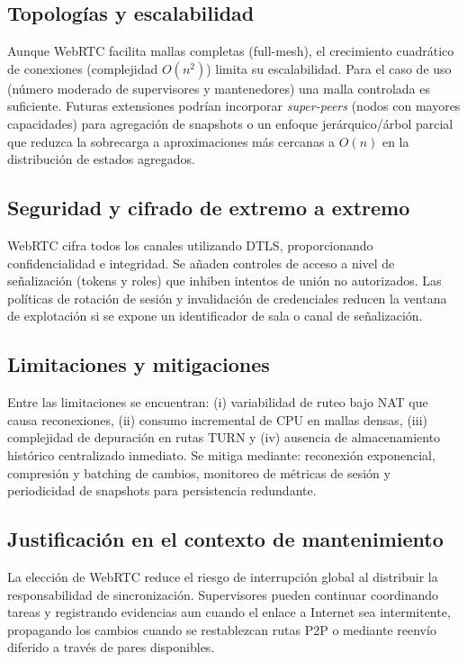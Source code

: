 \documentclass[12pt,a4paper]{report}
\begin{document}
\subsection*{Topologías y escalabilidad}
Aunque WebRTC facilita mallas completas (full-mesh), el crecimiento cuadrático de conexiones (complejidad $O(n^2)$) limita su escalabilidad. Para el caso de uso (número moderado de supervisores y mantenedores) una malla controlada es suficiente. Futuras extensiones podrían incorporar \textit{super-peers} (nodos con mayores capacidades) para agregación de snapshots o un enfoque jerárquico/árbol parcial que reduzca la sobrecarga a aproximaciones más cercanas a $O(n)$ en la distribución de estados agregados.

\subsection*{Seguridad y cifrado de extremo a extremo}
WebRTC cifra todos los canales utilizando DTLS, proporcionando confidencialidad e integridad. Se añaden controles de acceso a nivel de señalización (tokens y roles) que inhiben intentos de unión no autorizados. Las políticas de rotación de sesión y invalidación de credenciales reducen la ventana de explotación si se expone un identificador de sala o canal de señalización.

\subsection*{Limitaciones y mitigaciones}
Entre las limitaciones se encuentran: (i) variabilidad de ruteo bajo NAT que causa reconexiones, (ii) consumo incremental de CPU en mallas densas, (iii) complejidad de depuración en rutas TURN y (iv) ausencia de almacenamiento histórico centralizado inmediato. Se mitiga mediante: reconexión exponencial, compresión y batching de cambios, monitoreo de métricas de sesión y periodicidad de snapshots para persistencia redundante.

\subsection*{Justificación en el contexto de mantenimiento}
La elección de WebRTC reduce el riesgo de interrupción global al distribuir la responsabilidad de sincronización. Supervisores pueden continuar coordinando tareas y registrando evidencias aun cuando el enlace a Internet sea intermitente, propagando los cambios cuando se restablezcan rutas P2P o mediante reenvío diferido a través de pares disponibles.
\end{document}
